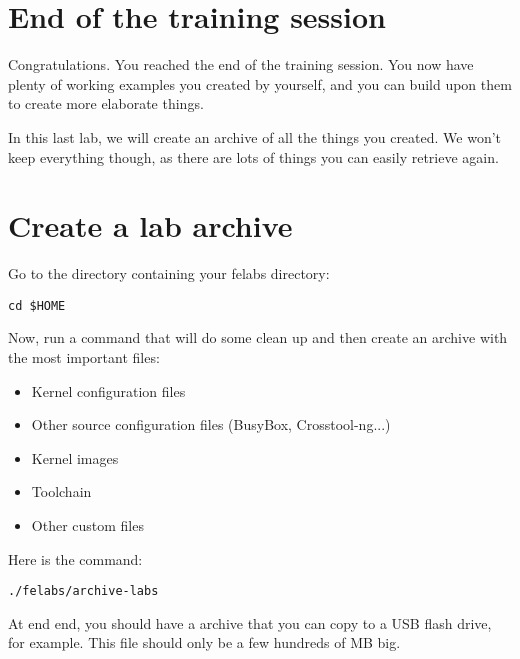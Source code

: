 
\section{End of the training session}

Congratulations. You reached the end of the training session. You now
have plenty of working examples you created by yourself, and you can
build upon them to create more elaborate things.

In this last lab, we will create an archive of all the things you
created. We won't keep everything though, as there are lots of things
you can easily retrieve again.

\section{Create a lab archive}

Go to the directory containing your felabs directory:

\begin{verbatim}
cd $HOME
\end{verbatim}

Now, run a command that will do some clean up and then create an archive with the most important files:

\begin{itemize}
\item Kernel configuration files
\item Other source configuration files (BusyBox, Crosstool-ng...)
\item Kernel images
\item Toolchain
\item Other custom files
\end{itemize}

Here is the command:

\begin{verbatim}
./felabs/archive-labs
\end{verbatim}

At end end, you should have a  archive
that you can copy to a USB flash drive, for example. This file should
only be a few hundreds of MB big.
